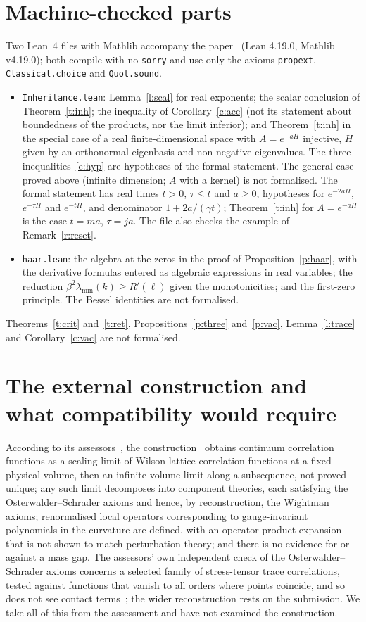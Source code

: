 \section{Machine-checked parts}\label{s:lean}
Two Lean~4 files with Mathlib accompany the paper~\cite{RepoLean} (Lean 4.19.0, Mathlib v4.19.0); both compile with no \texttt{sorry} and use
only the axioms \texttt{propext}, \texttt{Classical.choice} and \texttt{Quot.sound}.
\begin{itemize}
\item \texttt{Inheritance.lean}: Lemma~\ref{l:scal} for real exponents; the scalar conclusion of
Theorem~\ref{t:inh}; the inequality of Corollary~\ref{c:acc} (not its statement about boundedness of the
products, nor the limit inferior); and Theorem~\ref{t:inh} in the special case of a real finite-dimensional
space with $A=e^{-aH}$ injective, $H$ given by an orthonormal eigenbasis and non-negative eigenvalues. The
three inequalities~\eqref{e:hyp} are hypotheses of the formal statement. The general case proved above
(infinite dimension; $A$ with a kernel) is not formalised. The formal statement has real times $t>0$,
$\tau\le t$ and $a\ge0$, hypotheses for $e^{-2aH}$, $e^{-\tau H}$ and $e^{-tH}$, and denominator
$1+2a/(\gamma t)$; Theorem~\ref{t:inh} for $A=e^{-aH}$ is the case $t=ma$, $\tau=ja$. The file also checks the
example of Remark~\ref{r:reset}.
\item \texttt{haar.lean}: the algebra at the zeros in the proof of Proposition~\ref{p:haar}, with the
derivative formulas entered as algebraic expressions in real variables; the reduction
$\beta^2\lambda_{\min}(k)\ge R'(\ell)$ given the monotonicities; and the first-zero principle. The Bessel identities are not
formalised.
\end{itemize}
Theorems~\ref{t:crit} and~\ref{t:ret}, Propositions~\ref{p:three} and~\ref{p:vac}, Lemma~\ref{l:trace} and
Corollary~\ref{c:vac} are not formalised.

\section{The external construction and what compatibility would require}\label{s:ext}
According to its assessors~\cite[pp.~1, 3]{YMG}, the construction~\cite{OAI} obtains continuum correlation
functions as a scaling limit of Wilson lattice correlation functions at a fixed physical volume, then an
infinite-volume limit along a subsequence, not proved unique; any such limit decomposes into component
theories, each satisfying the Osterwalder--Schrader axioms and hence, by reconstruction, the Wightman axioms;
renormalised local operators corresponding to gauge-invariant polynomials in the curvature are defined, with
an operator product expansion that is not shown to match perturbation theory; and there is no evidence for or
against a mass gap. The assessors' own independent check of the Osterwalder--Schrader axioms concerns a
selected family of stress-tensor trace correlations, tested against functions that vanish to all orders where
points coincide, and so does not see contact terms~\cite[Part~II]{YMG}; the wider reconstruction rests on
the submission. We take all of this from the assessment and have not examined the construction.

